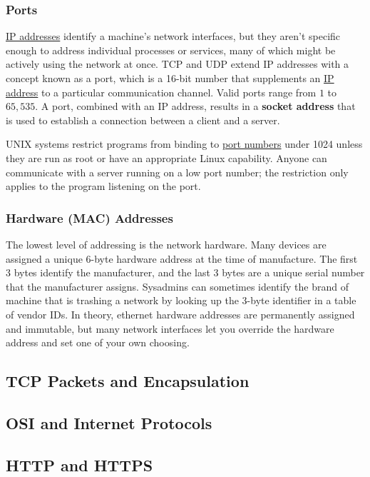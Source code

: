 \documentclass{article}
\begin{document}
    \subsubsection{Ports}

      \hyperref[def:ip-addresses]{IP addresses} identify a machine's network interfaces, but they aren't specific enough to address individual processes or services, many of which might be actively using the network at once. TCP and UDP extend IP addresses with a concept known as a port, which is a 16-bit number that supplements an \hyperref[def:ip-address]{IP address} to a particular communication channel. Valid ports range from $1$ to $65,535$. A port, combined with an IP address, results in a \textbf{socket address} that is used to establish a connection between a client and a server. 

      UNIX systems restrict programs from binding to \hyperref[def:port-number]{port numbers} under 1024 unless they are run as root or have an appropriate Linux capability. Anyone can communicate with a server running on a low port number; the restriction only applies to the program listening on the port.

    \subsubsection{Hardware (MAC) Addresses}

      The lowest level of addressing is the network hardware. Many devices are assigned a unique 6-byte hardware address at the time of manufacture. The first 3 bytes identify the manufacturer, and the last 3 bytes are a unique serial number that the manufacturer assigns. Sysadmins can sometimes identify the brand of machine that is trashing a network by looking up the 3-byte identifier in a table of vendor IDs. In theory, ethernet hardware addresses are permanently assigned and immutable, but many network interfaces let you override the hardware address and set one of your own choosing. 

  \subsection{TCP Packets and Encapsulation}

  \subsection{OSI and Internet Protocols}

  \subsection{HTTP and HTTPS} 
\end{document}

